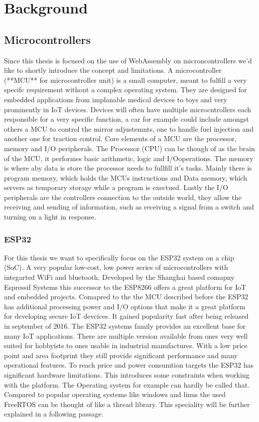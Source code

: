 
\chapter{Background}\label{chapter:background}

\section{Microcontrollers}
Since this thesis is focused on the use of WebAssembly on microncontrollers we'd like to shortly introduce the concept and limitations. A microcontroller (**MCU** for microcontroller unit) is a small computer, meant to fulfill a very specifc requirement without a complex operating system. They are designed for embedded applications from implanable medical devices to toys and very prominently in IoT devices. Devices will often have multiple microcntrollers each responsible for a very specific function, a car for example could include amongst others a MCU to control the mirror adjustemnts, one to handle fuel injection and another one for traction control.
Core elements of a MCU are the processor, memory and I/O peripherals. The Processor (CPU) can be though of as the brain of the MCU, it performes basic arithmetic, logic and I/Ooperations. The memory is where aby data is store the processor needs to fullfill it's tasks. Mainly there is program memory, which holds the MCUs instructions and Data memory, which servers as temporary storage while a program is exectued. Lastly the I/O peripherals are the controllers connection to the outside world, they allow the receiving and sending of information, such as receiving a signal from a switch and turning on a light in response.
\subsection{ESP32}
For this thesis we want to specifically focus on the ESP32 system on a chip (SoC). A very popular low-cost, low power series of microcontrollers with integarted WiFi and bluetooth. Developed by the Shanghai based comapny Espressif Systems this successor to the ESP8266 offers a great platform for IoT and embedded projects. Comapred to the the MCU described before the ESP32 has additional processing power and I/O options that make it a great platform for developing secure IoT devcices. It gained popularity fast after being released in september of 2016.
The ESP32 systems family provides an excellent base for many IoT applications. There are multiple version available from ones very well suited for hobbyists to ones usable in industrial manufactures. With a low price point and area footprint they still provide significant performance and many operational features.
To reach price and power consumtion targets the ESP32 has significant hardware limitations. This introduces some constraints when working with the platform. The Operating system for example can hardly be called that. Compared to popular operating systems like windows and linus the used FreeRTOS can be thought of like a thread library. This speciality will be further explained in a following passage.
